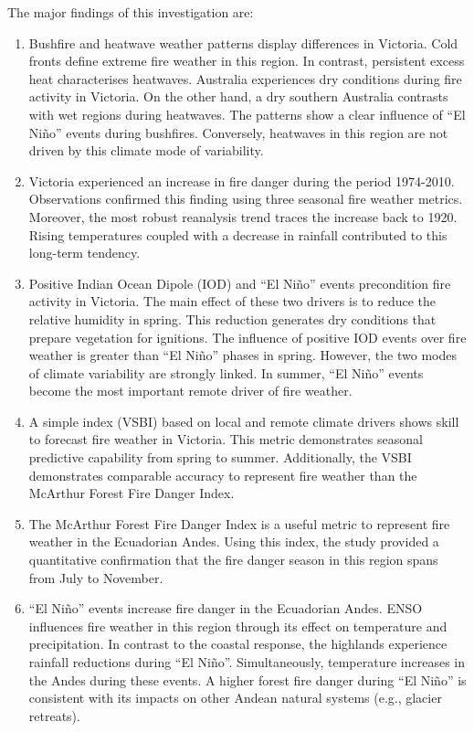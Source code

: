 The major findings of this investigation are:
\begin{enumerate}
\item Bushfire and heatwave weather patterns display differences in Victoria.
Cold fronts define extreme fire weather in this region. In contrast,
persistent excess heat characterises heatwaves. Australia experiences
dry conditions during fire activity in Victoria. On the other hand,
a dry southern Australia contrasts with wet regions during heatwaves.
The patterns show a clear influence of ``El Ni\~no'' events during
bushfires. Conversely, heatwaves in this region are not driven by
this climate mode of variability. 
\item Victoria experienced an increase in fire danger during the period
1974-2010. Observations confirmed this finding using three seasonal
fire weather metrics. Moreover, the most robust reanalysis trend traces
the increase back to 1920. Rising temperatures coupled with a decrease
in rainfall contributed to this long-term tendency.
\item Positive Indian Ocean Dipole (IOD) and ``El Ni\~no'' events precondition
fire activity in Victoria. The main effect of these two drivers is
to reduce the relative humidity in spring. This reduction generates
dry conditions that prepare vegetation for ignitions. The influence
of positive IOD events over fire weather is greater than ``El Ni\~no''
phases in spring. However, the two modes of climate variability are
strongly linked. In summer, ``El Ni\~no'' events become the most important
remote driver of fire weather.
\item A simple index (VSBI) based on local and remote climate drivers shows
skill to forecast fire weather in Victoria. This metric demonstrates
seasonal predictive capability from spring to summer. Additionally,
the VSBI demonstrates comparable accuracy to represent fire weather
than the McArthur Forest Fire Danger Index.
\item The McArthur Forest Fire Danger Index is a useful metric to represent
fire weather in the Ecuadorian Andes. Using this index, the study
provided a quantitative confirmation that the fire danger season in
this region spans from July to November. 
\item ``El Ni\~no'' events increase fire danger in the Ecuadorian Andes.
ENSO influences fire weather in this region through its effect on
temperature and precipitation. In contrast to the coastal response,
the highlands experience rainfall reductions during ``El Ni\~no''.
Simultaneously, temperature increases in the Andes during these events.
A higher forest fire danger during ``El Ni\~no'' is consistent with
its impacts on other Andean natural systems (e.g., glacier retreats).
\end{enumerate}

